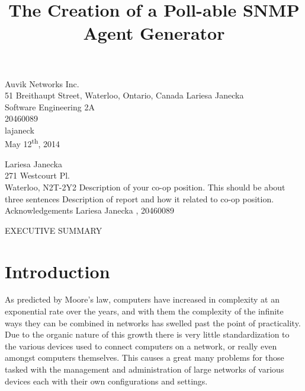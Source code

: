 \documentclass[12pt]{article}
\begin{document}
\title{The Creation of a Poll-able SNMP Agent Generator}
{
	Auvik Networks Inc.\\
	51 Breithaupt Street, Waterloo, Ontario, Canada
}
{
	Lariesa Janecka\\
	Software Engineering 2A\\
	20460089\\
	lajaneck\\
	May 12\textsuperscript{th}, 2014
}


{
	\noindent
	Lariesa Janecka\\
	271 Westcourt Pl.\\
	Waterloo, N2T-2Y2
}
{
	Description of your co-op position. This should be about three sentences
}
{
	Description of report and how it related to co-op position.
}
{
	Acknowledgements
}
{
	Lariesa Janecka , 20460089  
}


EXECUTIVE SUMMARY
\newpage


\toc


\section{Introduction}
\indent\indent As predicted by Moore's law, computers have increased in complexity at an exponential rate over the years, and with them the complexity of the infinite ways they can be combined in networks has swelled past the point of practicality. Due to the organic nature of this growth there is very little standardization to the various devices used to connect computers on a network, or really even amongst computers themselves. This causes a great many problems for those tasked with the management and administration of large networks of various devices each with their own configurations and settings.
\end{document}
